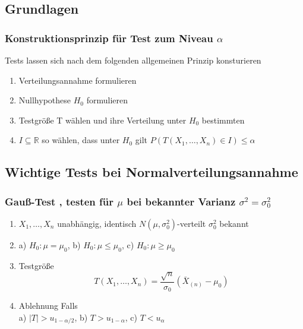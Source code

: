 \documentclass[
	ngerman,
	accentcolor=9c,%
	type=intern,
	marginpar=false
	]{tudapub}
\begin{document}
            \subsection{Grundlagen}
                \subsubsection*{Konstruktionsprinzip für Test zum Niveau $\alpha$}
                    Tests lassen sich nach dem folgenden allgemeinen Prinzip konsturieren
                    \begin{enumerate}
                        \item Verteilungsannahme formulieren
                        \item Nullhypothese $H_0$ formulieren
                        \item Testgröße T wählen und ihre Verteilung unter $H_0$ bestimmten
                        \item $I \subseteq \mathbb{R}$ so wählen, dass unter $H_0$ gilt $P(T(X_1,\dots,X_n)\in I) \leq \alpha$
                    \end{enumerate}
            \subsection{Wichtige Tests bei Normalverteilungsannahme}
                \subsubsection*{Gauß-Test , testen für $\mu$ bei bekannter Varianz $\sigma^2 = \sigma_0^2$}
                     \begin{enumerate}
                         \item $X_1,\dots,X_n$ unabhängig, identisch $N(\mu, \sigma^2_0)$-verteilt $\sigma^2_0$ bekannt
                         \item a) $H_0: \mu = \mu_0$, b) $H_0: \mu \leq \mu_0$, c) $H_0: \mu \geq \mu_0$     
                         \item Testgröße
                         \begin{equation*}
                             T(X_1,\dots,X_n)=\dfrac{\sqrt{n}}{\sigma_0}(\bar{X}_{(n)}-\mu_0)
                         \end{equation*} 
                         \item Ablehnung Falls\\
                               a) $|T| > u_{1-\alpha/2}$, b) $T > u_{1-\alpha}$, c) $T < u_{\alpha}$
                     \end{enumerate}
\end{document}
